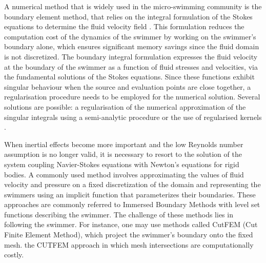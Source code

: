 \documentclass[graybox]{svmult}
\begin{document}
A numerical method that is widely used in the micro-swimming community is the boundary element method, that relies on the integral formulation of the Stokes equations to determine the fluid velocity field \cite{pozrikidis1992boundary}. 
This formulation reduces the computation cost of the dynamics of the swimmer by working on the swimmer's boundary alone, which ensures significant memory savings since the fluid domain is not discretized. 
The boundary integral formulation expresses the fluid velocity at the boundary of the swimmer as a function of fluid stresses and velocities, via the fundamental solutions of the Stokes equations. Since these functions exhibit singular behaviour when the source and evaluation points are close together, a regularisation procedure needs to be employed for the numerical solution. Several solutions are possible: a regularisation of the numerical approximation of the singular integrals using a semi-analytic procedure \cite{huang_cruse} or the use of regularised kernels \cite{Fauci}. 




When inertial effects become more important and the low Reynolds number assumption is no longer valid, 
it is necessary to resort to the solution of the system coupling Navier-Stokes equations with Newton's equations for rigid bodies. 
A commonly used method involves approximating the values of fluid velocity and pressure on a fixed discretization of the domain and representing the swimmers using an implicit function that parameterizes their boundaries. 
These approaches are commonly referred to Immersed Boundary Methods with level set functions describing the swimmer. 
The challenge of these methods lies in following the swimmer. 
For instance, one may use methods called CutFEM (Cut Finite Element Method), which project the swimmer's boundary onto the fixed mesh.
the CUTFEM approach in which mesh intersections are computationally costly. \cite{Monasse,Iollo,bergmann2016bioinspired,hansbo2016cut,burman2015cutfem}




\end{document}

